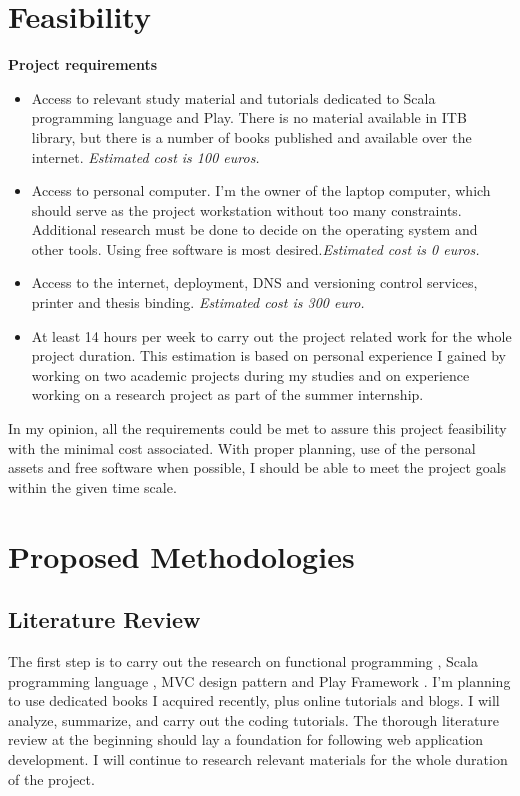\documentclass[12pt,twoside,a4paper]{report}
\begin{document}
\section{Feasibility}\label{1.5}
\textbf{Project requirements}
\begin{itemize}\itemsep1pt \parskip0pt 
\item Access to relevant study material and tutorials dedicated to Scala programming language and Play. There is no material available in ITB library, but there is a number of books published and available over the internet. \textit{Estimated cost is 100 euros.}
\item Access to personal computer. I'm the owner of the laptop computer, which should serve as the project workstation without too many constraints. Additional research must be done to decide on the operating system and other tools. Using free software is most desired.\textit{Estimated cost is 0 euros.}
\item Access to the internet, deployment, DNS and versioning control services, printer and thesis binding.\textit{ Estimated cost is 300 euro.}
\item At least 14 hours per week to carry out the project related work for the whole project duration. This estimation is based on personal experience I gained by working on two academic projects during my studies and on experience working on a research project as part of the summer internship.
\end{itemize}
In my opinion, all the requirements could be met to assure this project feasibility with the minimal cost associated. With proper planning, use of the personal assets and free software when possible, I should be able to meet the project goals within the given time scale.
\section{Proposed Methodologies}\label{1.6}
\subsection{Literature Review}\label{1.6.1}
The first step is to carry out the research on functional programming \cite{9}, Scala programming language \cite{10}, MVC design pattern and Play Framework \cite{11}. I'm planning to use dedicated books I acquired recently, plus online tutorials and blogs. I will analyze, summarize, and carry out the coding tutorials. The thorough literature review at the beginning should lay a foundation for following web application development. I will continue to research relevant materials for the whole duration of the project.
\end{document}
